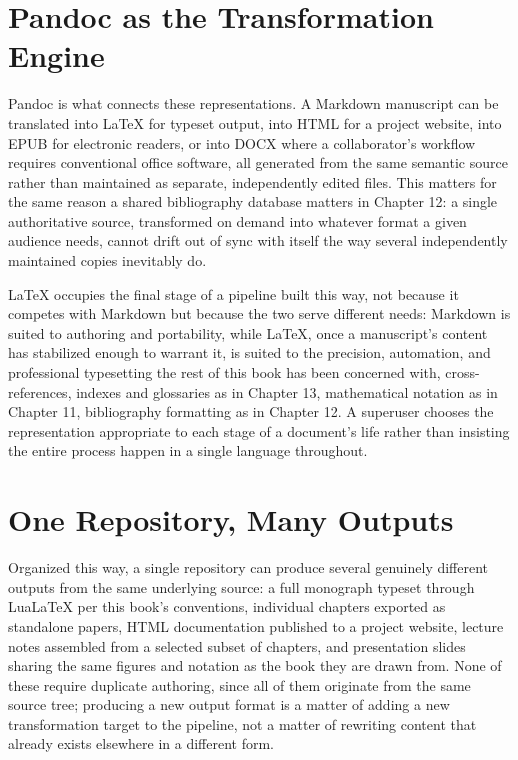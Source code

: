 \hypertarget{pandoc-as-the-transformation-engine}{%
\section{Pandoc as the Transformation Engine}\label{pandoc-as-the-transformation-engine}}

Pandoc is what connects these representations. A Markdown manuscript can be translated into LaTeX for typeset output, into HTML for a project website, into EPUB for electronic readers, or into DOCX where a collaborator's workflow requires conventional office software, all generated from the same semantic source rather than maintained as separate, independently edited files. This matters for the same reason a shared bibliography database matters in Chapter 12: a single authoritative source, transformed on demand into whatever format a given audience needs, cannot drift out of sync with itself the way several independently maintained copies inevitably do.

LaTeX occupies the final stage of a pipeline built this way, not because it competes with Markdown but because the two serve different needs: Markdown is suited to authoring and portability, while LaTeX, once a manuscript's content has stabilized enough to warrant it, is suited to the precision, automation, and professional typesetting the rest of this book has been concerned with, cross-references, indexes and glossaries as in Chapter 13, mathematical notation as in Chapter 11, bibliography formatting as in Chapter 12. A superuser chooses the representation appropriate to each stage of a document's life rather than insisting the entire process happen in a single language throughout.

\hypertarget{one-repository-many-outputs}{%
\section{One Repository, Many Outputs}\label{one-repository-many-outputs}}

Organized this way, a single repository can produce several genuinely different outputs from the same underlying source: a full monograph typeset through LuaLaTeX per this book's conventions, individual chapters exported as standalone papers, HTML documentation published to a project website, lecture notes assembled from a selected subset of chapters, and presentation slides sharing the same figures and notation as the book they are drawn from. None of these require duplicate authoring, since all of them originate from the same source tree; producing a new output format is a matter of adding a new transformation target to the pipeline, not a matter of rewriting content that already exists elsewhere in a different form.


